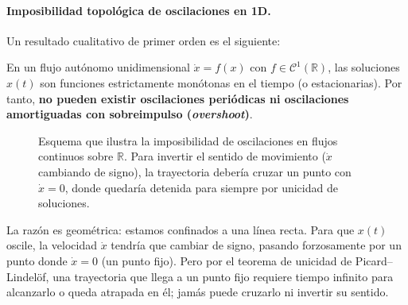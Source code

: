 \paragraph{Imposibilidad topológica de oscilaciones en 1D.}
Un resultado cualitativo de primer orden es el siguiente:
\begin{theorem}
    En un flujo autónomo unidimensional $\dot{x} = f(x)$ con $f \in \mathcal{C}^1(\mathbb{R})$, las soluciones $x(t)$ son funciones estrictamente monótonas en el tiempo (o estacionarias). Por tanto, \textbf{no pueden existir oscilaciones periódicas ni oscilaciones amortiguadas con sobreimpulso (\emph{overshoot})}.
\end{theorem}

\begin{figure}[htbp]
\centering
{}
\caption{Esquema que ilustra la imposibilidad de oscilaciones en flujos continuos sobre $\mathbb{R}$. Para invertir el sentido de movimiento ($\dot{x}$ cambiando de signo), la trayectoria debería cruzar un punto con $\dot{x} = 0$, donde quedaría detenida para siempre por unicidad de soluciones.}
\label{fig:imposibilidad_oscilaciones}
\end{figure}

La razón es geométrica: estamos confinados a una línea recta. Para que $x(t)$ oscile, la velocidad $\dot{x}$ tendría que cambiar de signo, pasando forzosamente por un punto donde $\dot{x} = 0$ (un punto fijo). Pero por el teorema de unicidad de Picard--Lindelöf, una trayectoria que llega a un punto fijo requiere tiempo infinito para alcanzarlo o queda atrapada en él; jamás puede cruzarlo ni invertir su sentido.

